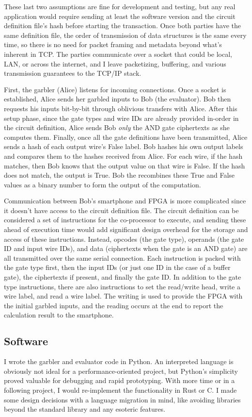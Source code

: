 These last two assumptions are fine for development and testing, but any real application would require sending at least the software version and the circuit definition file's hash before starting the transaction. Once both parties have the same definition file, the order of transmission of data structures is the same every time, so there is no need for packet framing and metadata beyond what's inherent in TCP. The parties communicate over a socket that could be local, LAN, or across the internet, and I leave packetizing, buffering, and various transmission guarantees to the TCP/IP stack.

First, the garbler (Alice) listens for incoming connections. Once a socket is established, Alice sends her garbled inputs to Bob (the evaluator). Bob then requests his inputs bit-by-bit through oblivious transfers with Alice. After this setup phase, since the gate types and wire IDs are already provided in-order in the circuit definition, Alice sends Bob \textit{only} the AND gate ciphertexts as she computes them. Finally, once all the gate definitions have been transmitted, Alice sends a hash of each output wire's False label. Bob hashes his own output labels and compares them to the hashes received from Alice. For each wire, if the hash matches, then Bob knows that the output value on that wire is False. If the hash does not match, the output is True. Bob the recombines these True and False values as a binary number to form the output of the computation.

Communication between Bob's smartphone and FPGA is more complicated since it doesn't have access to the circuit definition file. The circuit definition can be considered a set of instructions for the co-processor to execute, and sending these ahead of execution time would add significant design overhead for the storage and access of these instructions. Instead, opcodes (the gate type), operands (the gate ID and input wire IDs), and data (ciphertexts when the gate is an AND gate) are all transmitted over the same serial connection. Each instruction is packed with the gate type first, then the input IDs (or just one ID in the case of a buffer gate), the ciphertexts if present, and finally the gate ID. In addition to the gate type instructions, there are also instructions to set the read/write head, write a wire label, and read a wire label. The writing is used to provide the FPGA with the initial garbled inputs, and the reading occurs at the end to report the calculation result to the smartphone.

\subsection{Software}
I wrote the garbler and evaluator code in Python. An interpreted language is obviously not ideal for a performance-oriented project, but Python's simplicity proved valuable for debugging and rapid prototyping. With more time or in a following project, I would re-implement the functionality in Rust or C. I made some design decisions with a language migration in mind, like avoiding libraries beyond the standard library and any esoteric features.

